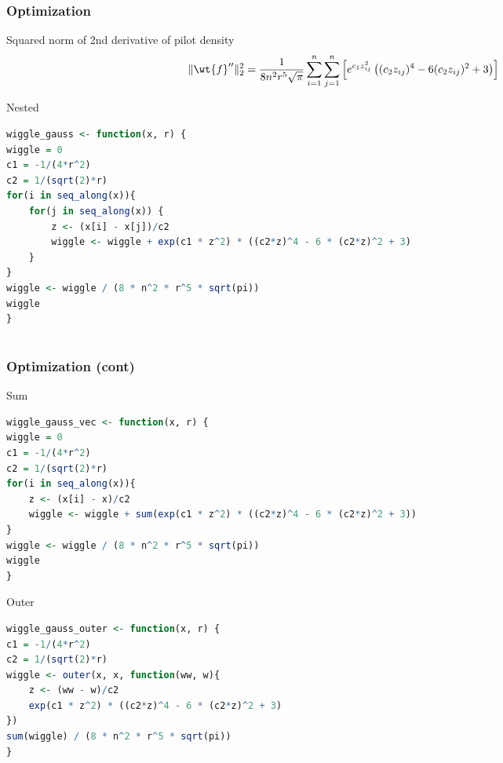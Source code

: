 \section{}
\begin{frame}[fragile]
	\frametitle{Optimization}
	
		Squared norm of 2nd derivative of pilot density
		\begin{equation}
		\label{eq:10}
			\lVert \wt{f}''\rVert_2^2 = \dfrac{1}{8n^2r^5\sqrt{\pi}} \sum_{i=1}^n \sum_{j=1}^n\left[ e^{c_1z_{ij}^2} \left( (c_2z_{ij})^4 - 6(c_2z_{ij})^2 + 3 \right) \right]
		\end{equation}
	
		Nested
			\begin{lstlisting}[language=R]
wiggle_gauss <- function(x, r) {
wiggle = 0
c1 = -1/(4*r^2)
c2 = 1/(sqrt(2)*r)
for(i in seq_along(x)){
	for(j in seq_along(x)) {
		z <- (x[i] - x[j])/c2
		wiggle <- wiggle + exp(c1 * z^2) * ((c2*z)^4 - 6 * (c2*z)^2 + 3)
	}
}
wiggle <- wiggle / (8 * n^2 * r^5 * sqrt(pi))
wiggle
}
			\end{lstlisting}

\end{frame}

\section{}
\begin{frame}[fragile]
	\frametitle{Optimization (cont)}
	Sum
		\begin{lstlisting}[language=R]
wiggle_gauss_vec <- function(x, r) {
wiggle = 0
c1 = -1/(4*r^2)
c2 = 1/(sqrt(2)*r)
for(i in seq_along(x)){
	z <- (x[i] - x)/c2
	wiggle <- wiggle + sum(exp(c1 * z^2) * ((c2*z)^4 - 6 * (c2*z)^2 + 3))
}
wiggle <- wiggle / (8 * n^2 * r^5 * sqrt(pi))
wiggle
}
	\end{lstlisting}
	Outer
		\begin{lstlisting}[language=R]
wiggle_gauss_outer <- function(x, r) {
c1 = -1/(4*r^2)
c2 = 1/(sqrt(2)*r)
wiggle <- outer(x, x, function(ww, w){
	z <- (ww - w)/c2
	exp(c1 * z^2) * ((c2*z)^4 - 6 * (c2*z)^2 + 3)
})
sum(wiggle) / (8 * n^2 * r^5 * sqrt(pi))
}
		\end{lstlisting}
	
\end{frame}




